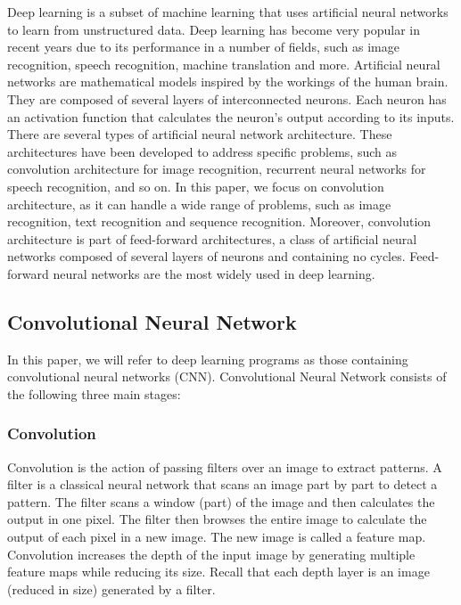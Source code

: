 \label{sec:introduction}

Deep learning is a subset of machine learning that uses artificial neural networks to learn from unstructured data. Deep learning has become very popular in recent years due to its performance in a number of fields, such as image recognition, speech recognition, machine translation and more. Artificial neural networks are mathematical models inspired by the workings of the human brain. They are composed of several layers of interconnected neurons. Each neuron has an activation function that calculates the neuron's output according to its inputs. There are several types of artificial neural network architecture. These architectures have been developed to address specific problems, such as convolution architecture for image recognition, recurrent neural networks for speech recognition, and so on. In this paper, we focus on convolution architecture, as it can handle a wide range of problems, such as image recognition, text recognition and sequence recognition. Moreover, convolution architecture is part of feed-forward architectures, a class of artificial neural networks composed of several layers of neurons and containing no cycles. Feed-forward neural networks are the most widely used in deep learning.\\


\subsection{Convolutional Neural Network}
In this paper, we will refer to deep learning programs as those containing convolutional neural networks (CNN). Convolutional Neural Network consists of the following three main stages:\\

\subsubsection*{Convolution}
Convolution is the action of passing filters over an image to extract patterns. A filter is a classical neural network that scans an image part by part to detect a pattern. The filter scans a window (part) of the image and then calculates the output in one pixel. The filter then browses the entire image to calculate the output of each pixel in a new image. The new image is called a feature map. Convolution increases the depth of the input image by generating multiple feature maps while reducing its size. Recall that each depth layer is an image (reduced in size) generated by a filter.\\

